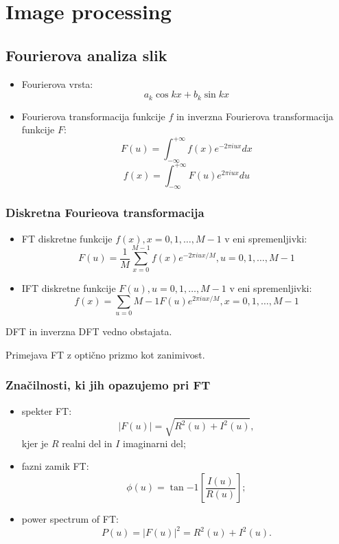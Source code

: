 \chapter{Image processing}
\section{Fourierova analiza slik}
\begin{itemize}
\item Fourierova vrsta:
$$a_k \cos kx + b_k \sin kx$$
\item Fourierova transformacija funkcije $f$ in inverzna Fourierova transformacija funkcije $F$:
$$F(u) = \int_{-\infty}^{+\infty}f(x)e^{-2\pi iux}dx$$
$$f(x) = \int_{-\infty}^{+\infty}F(u)e^{2\pi iux}du$$
\end{itemize}
%
\subsection{Diskretna Fourieova transformacija}
\begin{itemize}
\item FT diskretne funkcije $f(x), x = 0,1,\ldots,M-1$ v eni spremenljivki:
$$F(u) = \frac{1}{M}\sum_{x=0}^{M-1}f(x)e^{-2\pi iux/M}, u = 0,1,\ldots,M-1$$
\item IFT diskretne funkcije $F(u), u = 0,1,\ldots,M-1$ v eni spremenljivki:
$$f(x) = \sum_{u = 0}{M-1}F(u)e^{2\pi iux/M}, x = 0,1,\ldots,M-1$$
\end{itemize}
%
\begin{opomba}
DFT in inverzna DFT vedno obstajata.
\end{opomba}
%
Primejava FT z optično prizmo kot zanimivost.
%
\subsection{Značilnosti, ki jih opazujemo pri FT}
\begin{itemize}
\item spekter FT:
$$|F(u)| = \sqrt{R^2(u) + I^2(u)},$$
kjer je $R$ realni del in $I$ imaginarni del;
\item fazni zamik FT:
$$\phi(u) = \tan{-1} \left[\frac{I(u)}{R(u)}\right];$$
\item power spectrum of FT:
$$P(u) = |F(u)|^2 = R^2(u) + I^2(u).$$
\end{itemize}
%
